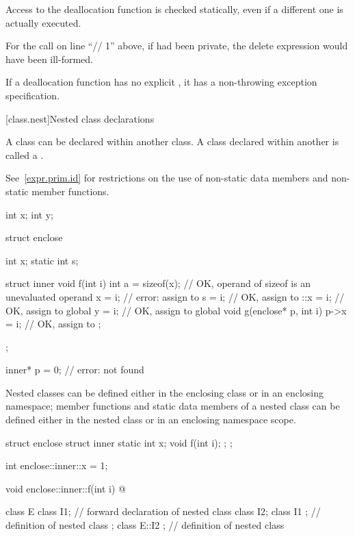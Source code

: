 \pnum
Access to the deallocation function is checked statically,
even if a different one is actually executed.
\begin{example}
For the call on line ``// 1'' above,
if
had been private, the delete expression would have been ill-formed.
\end{example}

\pnum
\begin{note}
If a deallocation function has no explicit , it
has a non-throwing exception specification.
\end{note}

[class.nest]{Nested class declarations}%
%

\pnum
A class can be declared within another class. A class declared within
another is called a .
\begin{note}
See~\ref{expr.prim.id} for restrictions on the use of non-static data
members and non-static member functions.
\end{note}

\begin{example}
\begin{codeblock}
int x;
int y;

struct enclose {
  int x;
  static int s;

  struct inner {
    void f(int i) {
      int a = sizeof(x);        // OK, operand of sizeof is an unevaluated operand
      x = i;                    // error: assign to 
      s = i;                    // OK, assign to 
      ::x = i;                  // OK, assign to global 
      y = i;                    // OK, assign to global 
    }
    void g(enclose* p, int i) {
      p->x = i;                 // OK, assign to 
    }
  };
};

inner* p = 0;                   // error:  not found
\end{codeblock}
\end{example}

\pnum
\begin{note}
Nested classes can be defined
either in the enclosing class or in an enclosing namespace;
member functions and static data members of a nested class can be
defined either in the nested class or in an enclosing namespace scope.
\begin{example}
\begin{codeblock}
struct enclose {
  struct inner {
    static int x;
    void f(int i);
  };
};

int enclose::inner::x = 1;

void enclose::inner::f(int i) { @\commentellip@ }

class E {
  class I1;                     // forward declaration of nested class
  class I2;
  class I1 { };                 // definition of nested class
};
class E::I2 { };                // definition of nested class
\end{codeblock}
\end{example}
\end{note}

